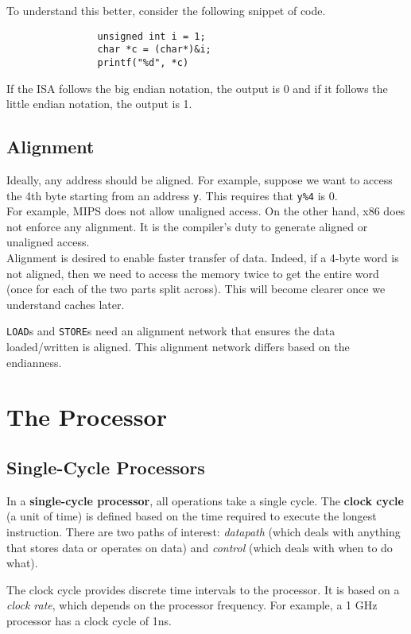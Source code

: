 \documentclass{article}
\begin{document}
			To understand this better, consider the following snippet of code.

			\begin{verbatim}
				unsigned int i = 1;
				char *c = (char*)&i;
				printf("%d", *c)
			\end{verbatim}

			If the ISA follows the big endian notation, the output is 0 and if it follows the little endian notation, the output is 1.

		\subsection{Alignment}

			Ideally, any address should be aligned. For example, suppose we want to access the 4th byte starting from an address \texttt{y}. This requires that \texttt{y\%4} is 0.\\
			For example, MIPS does not allow unaligned access. On the other hand, x86 does not enforce any alignment. It is the compiler's duty to generate aligned or unaligned access.\\
			Alignment is desired to enable faster transfer of data. Indeed, if a 4-byte word is not aligned, then we need to access the memory twice to get the entire word (once for each of the two parts split across). This will become clearer once we understand caches later.

			\texttt{LOAD}s and \texttt{STORE}s need an alignment network that ensures the data loaded/written is aligned. This alignment network differs based on the endianness.

\section{The Processor}

	\subsection{Single-Cycle Processors}

		In a \textbf{single-cycle processor}, all operations take a single cycle. The \textbf{clock cycle} (a unit of time) is defined based on the time required to execute the longest instruction. There are two paths of interest: \emph{datapath} (which deals with anything that stores data or operates on data) and \emph{control} (which deals with when to do what). 

		The clock cycle provides discrete time intervals to the processor. It is based on a \emph{clock rate}, which depends on the processor frequency. For example, a 1 GHz processor has a clock cycle of 1ns.
\end{document}
